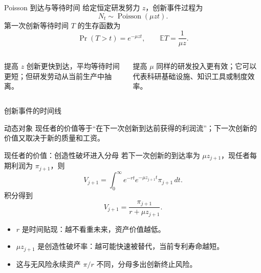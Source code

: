 \documentclass[aspectratio=32]{beamer}
\begin{document}
\begin{frame}{Poisson 到达与等待时间}
\small
给定恒定研发努力 $z$，创新事件过程为
\[
  N_t\sim\operatorname{Poisson}(\mu zt).
\]
第一次创新等待时间 $T$ 的生存函数为
\[
  \Pr(T>t)=e^{-\mu zt},
  \qquad \mathbb{E}T=\frac{1}{\mu z}.
\]
\begin{columns}[T]
\begin{block}{提高 $z$}
创新更快到达，平均等待时间更短；但研发劳动从当前生产中抽离。
\end{block}
\begin{block}{提高 $\mu$}
同样的研发投入更有效；它可以代表科研基础设施、知识工具或制度效率。
\end{block}
\end{columns}
\end{frame}

\begin{frame}{创新事件的时间线}
\small
\begin{center}
\end{center}
\vspace{0.22cm}
\begin{block}{动态对象}
现任者的价值等于“在下一次创新到达前获得的利润流”；下一次创新的价值又取决于新的质量和工资。
\end{block}
\end{frame}

\begin{frame}{现任者的价值：创造性破坏进入分母}
\small
若下一次创新的到达率为 $\mu z_{j+1}$，现任者每期利润为 $\pi_{j+1}$，则
\[
  V_{j+1}=\int_0^\infty e^{-rt}e^{-\mu z_{j+1}t}\pi_{j+1}\,dt.
\]
积分得到
\[
  \boxed{V_{j+1}=\frac{\pi_{j+1}}{r+\mu z_{j+1}}}.
\]
\begin{itemize}
  \item $r$ 是时间贴现：越不看重未来，资产价值越低。
  \item $\mu z_{j+1}$ 是创造性破坏率：越可能快速被替代，当前专利寿命越短。
  \item 这与无风险永续资产 $\pi/r$ 不同，分母多出创新终止风险。
\end{itemize}
\end{frame}
\end{document}
